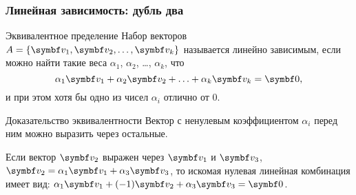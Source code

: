 \begin{frame}
  \frametitle{Линейная зависимость: дубль два}

\begin{block}{Эквивалентное пределение} Набор векторов $A = \{ \bv_1, \bv_2, \ldots, \bv_k\}$ называется \alert{линейно зависимым},
  если можно найти такие веса $\alpha_1$, $\alpha_2$, \ldots, $\alpha_k$, что
  \[
  \alpha_1 \bv_1 + \alpha_2 \bv_2 + \ldots + \alpha_k \bv_k = \bzero,  
  \]
  и при этом хотя бы одно из чисел $\alpha_i$ отлично от $0$. 
\end{block}

\pause

\begin{block}{Доказательство эквивалентности}
Вектор с ненулевым коэффициентом $\alpha_i$ перед ним можно выразить через остальные. 
\pause

Если вектор $\bv_2$ выражен через $\bv_1$ и $\bv_3$, $\bv_2 = \alpha_1 \bv_1 + \alpha_3 \bv_3$, 
то искомая нулевая линейная комбинация имеет вид: $\alpha_1 \bv_1 +(-1)\bv_2 + \alpha_3 \bv_3=\bzero$.
\end{block}

\end{frame}